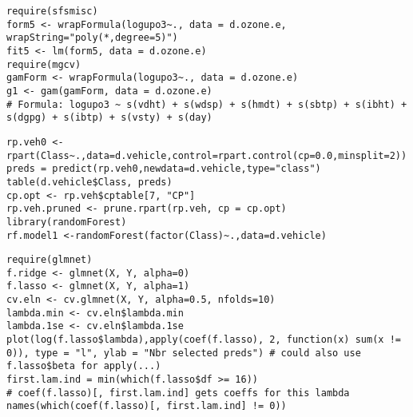 \begin{lstlisting}[style=RStyle, caption={GAMs},numbers=none]
require(sfsmisc)
form5 <- wrapFormula(logupo3~., data = d.ozone.e, wrapString="poly(*,degree=5)")
fit5 <- lm(form5, data = d.ozone.e)
require(mgcv)
gamForm <- wrapFormula(logupo3~., data = d.ozone.e)
g1 <- gam(gamForm, data = d.ozone.e)
# Formula: logupo3 ~ s(vdht) + s(wdsp) + s(hmdt) + s(sbtp) + s(ibht) + s(dgpg) + s(ibtp) + s(vsty) + s(day)
\end{lstlisting}

\vspace{-14pt}

\begin{lstlisting}[style=RStyle, caption={Trees and Forests},numbers=none]
rp.veh0 <- rpart(Class~.,data=d.vehicle,control=rpart.control(cp=0.0,minsplit=2))
preds = predict(rp.veh0,newdata=d.vehicle,type="class")
table(d.vehicle$Class, preds)
cp.opt <- rp.veh$cptable[7, "CP"]
rp.veh.pruned <- prune.rpart(rp.veh, cp = cp.opt)
library(randomForest)
rf.model1 <-randomForest(factor(Class)~.,data=d.vehicle)
\end{lstlisting}

\vspace{-14pt}

\begin{lstlisting}[style=RStyle, caption={Ridge and Lasso},numbers=none]
require(glmnet)
f.ridge <- glmnet(X, Y, alpha=0)
f.lasso <- glmnet(X, Y, alpha=1)
cv.eln <- cv.glmnet(X, Y, alpha=0.5, nfolds=10)
lambda.min <- cv.eln$lambda.min
lambda.1se <- cv.eln$lambda.1se
plot(log(f.lasso$lambda),apply(coef(f.lasso), 2, function(x) sum(x != 0)), type = "l", ylab = "Nbr selected preds") # could also use f.lasso$beta for apply(...)
first.lam.ind = min(which(f.lasso$df >= 16))
# coef(f.lasso)[, first.lam.ind] gets coeffs for this lambda
names(which(coef(f.lasso)[, first.lam.ind] != 0))
\end{lstlisting}
